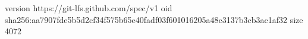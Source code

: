 version https://git-lfs.github.com/spec/v1
oid sha256:aa7907fde5b5d2cf34f575b65e40fadf03f601016205a48c3137b3cb3ac1af32
size 4072
